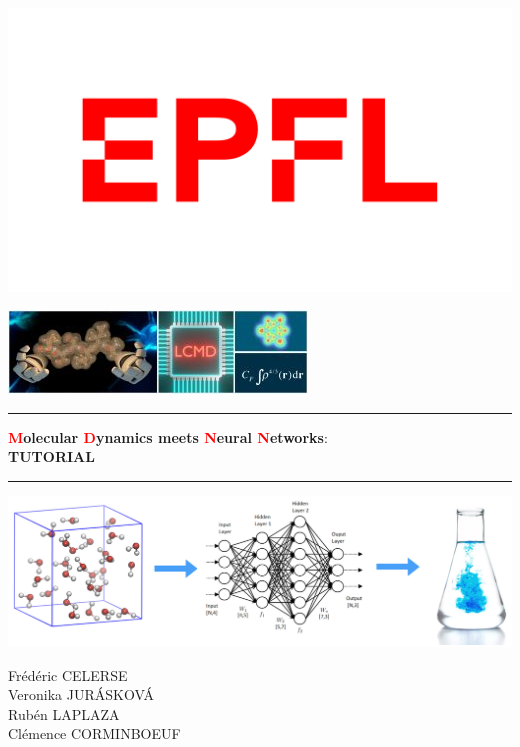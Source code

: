 \documentclass[12pt]{article}
\newcommand\Warning{%
 \makebox[1.4em][c]{%
 \makebox[0pt][c]{\raisebox{.1em}{\small!}}%
 \makebox[0pt][c]{\color{red}\Large$\bigtriangleup$}}}%
\begin{document}
\begin{minipage}[c]{0.5\linewidth}
\includegraphics[scale=0.2]{EPFL-logo.png}
\end{minipage}
\begin{minipage}[c]{0.5\linewidth}
\includegraphics[scale=0.75]{lcmd-logo.jpg}
\end{minipage}
\vspace{0.5cm}
\hrule 
\vspace{0.5cm}
\begin{center}
\LARGE \textbf{\textcolor{red}{M}olecular \textcolor{red}{D}ynamics meets \textcolor{red}{N}eural \textcolor{red}{N}etworks}: \\
\LARGE \textbf{TUTORIAL}
\vspace{0.5cm}
\\ %
\end{center}
\hrule 
\vspace{2cm}
\begin{center}
\includegraphics[scale=0.17]{Picture.jpeg}
\end{center}
\vspace{1cm}
\begin{center}
    Frédéric CELERSE \\
    Veronika JURÁSKOVÁ \\
    Rubén LAPLAZA \\
    Clémence CORMINBOEUF
\end{center}
 
\end{document}
